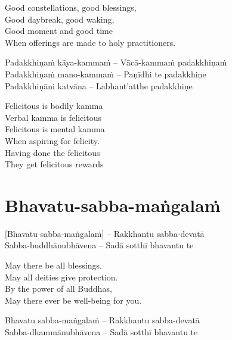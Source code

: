 \begin{english-verses}
  Good constellations, good blessings,\\
  Good daybreak, good waking,\\
  Good moment and good time\\
  When offerings are made to holy practitioners.
\end{english-verses}

Padakkhiṇaṁ kāya-kammaṁ – Vācā-kammaṁ padakkhiṇaṁ\\
Padakkhiṇaṁ mano-kammaṁ – Paṇīdhi te padakkhiṇe\hyperlink{endnote127-appendix}{\hypertarget{endnote127-body}{}}\\
Padakkhiṇāni katvāna – Labhant'atthe padakkhiṇe

\begin{english-verses}
  Felicitous is bodily kamma\\
  Verbal kamma is felicitous\\
  Felicitous is mental kamma\\
  When aspiring for felicity.\\
  Having done the felicitous\\
  They get felicitous rewards
\end{english-verses}

\suttaRef{[AN 3.155]}

\section{Bhavatu-sabba-maṅgalaṁ}
\label{bhavatu-sabba-mangalam}

\vspace{-1em}

[Bhavatu sabba-maṅgalaṁ] – Rakkhantu sabba-devatā\\
Sabba-buddhānubhāvena – Sadā sotthī bhavantu te

\begin{english-verses}
  May there be all blessings.\\
  May all deities give protection.\\
  By the power of all Buddhas,\\
  May there ever be well-being for you.
\end{english-verses}

Bhavatu sabba-maṅgalaṁ – Rakkhantu sabba-devatā\\
Sabba-dhammānubhāvena – Sadā sotthī bhavantu te

